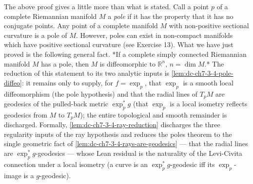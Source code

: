 \begin{remark}[poles]
  \label{rem:dc-ch7-3-4}
  \leanok
  The above proof gives a little more than what is stated. Call a point $p$ of a
  complete Riemannian manifold $M$ a \emph{pole} if it has the property that it has no
  conjugate points. Any point of a complete manifold $M$ with non-positive
  sectional curvature is a pole of $M$. However, poles can exist in non-compact
  manifolds which have positive sectional curvature (see Exercise 13). What we have
  just proved is the following general fact. *If a complete simply connected
  Riemannian manifold $M$ has a pole, then $M$ is diffeomorphic to $\mathbb{R}^n$,
  $n=\dim M$.* The reduction of this statement to its two analytic inputs is
  \cref{lem:dc-ch7-3-4-pole-diffeo}: it remains only to supply, for $f=\exp_p$, that
  $\exp_p$ is a smooth local diffeomorphism (the pole hypothesis) and that the radial lines
  of $T_pM$ are geodesics of the pulled-back metric $\exp_p^*g$ (that $\exp_p$ is a local
  isometry reflects geodesics from $M$ to $T_pM$); the entire topological and smooth
  remainder is discharged. Formally, \cref{lem:dc-ch7-3-4-ray-reduction} discharges the
  three regularity inputs of the ray hypothesis and reduces the poles theorem to the
  single geometric fact of \cref{lem:dc-ch7-3-4-rays-are-geodesics} — that the radial
  lines are $\exp_p^*g$-geodesics — whose Lean residual is the naturality of the
  Levi-Civita connection under a local isometry (a curve is an $\exp_p^*g$-geodesic iff
  its $\exp_p$-image is a $g$-geodesic).
\end{remark}
